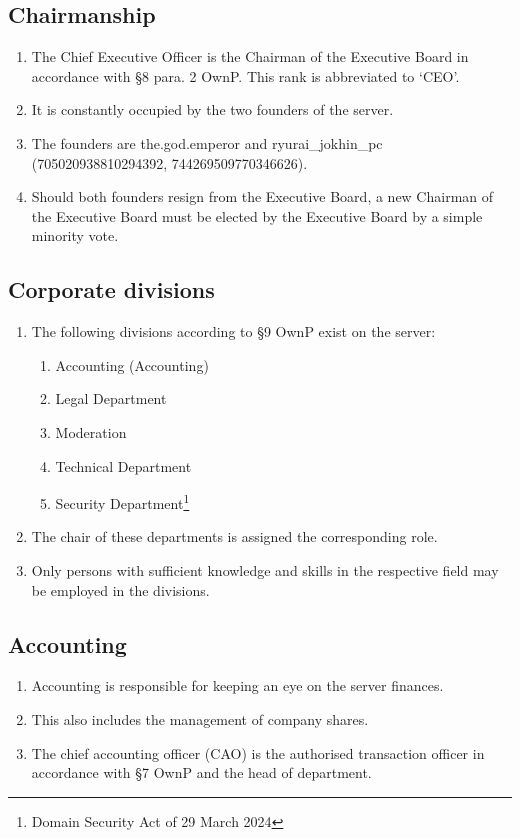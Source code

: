 \documentclass{article}
\begin{document}
\subsection{Chairmanship}
\begin{enumerate}[(1)]
	\item The Chief Executive Officer is the Chairman of the Executive Board in accordance with §8 para. 2 OwnP. This rank is abbreviated to `CEO'.
	\item It is constantly occupied by the two founders of the server.
	\item The founders are the.god.emperor and ryurai\_jokhin\_pc (705020938810294392, 744269509770346626).
	\item Should both founders resign from the Executive Board, a new Chairman of the Executive Board must be elected by the Executive Board by a simple minority vote.
\end{enumerate}

\subsection{Corporate divisions}
\begin{enumerate}[(1)]
	\item The following divisions according to §9 OwnP exist on the server:
		\begin{enumerate}[1.]
			\item Accounting (Accounting)
			\item Legal Department
			\item Moderation
			\item Technical Department
			\item Security Department\footnote{Domain Security Act of 29 March 2024}
		\end{enumerate}
	\item The chair of these departments is assigned the corresponding role.
	\item Only persons with sufficient knowledge and skills in the respective field may be employed in the divisions.
\end{enumerate}

\subsection{Accounting}
\begin{enumerate}[(1)]
	\item Accounting is responsible for keeping an eye on the server finances.
	\item This also includes the management of company shares.
	\item The chief accounting officer (CAO) is the authorised transaction officer in accordance with §7 OwnP and the head of department.
\end{enumerate}
\end{document}
